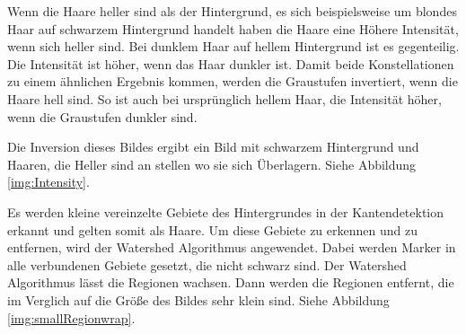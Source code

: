 \documentclass[german,a4paper, 12pt]{llncs}
\begin{document}
Wenn die Haare heller sind als der Hintergrund, es sich beispielsweise um blondes Haar auf schwarzem Hintergrund handelt haben die Haare eine Höhere Intensität, wenn sich heller sind. Bei dunklem Haar auf hellem Hintergrund ist es gegenteilig. Die Intensität ist höher, wenn das Haar dunkler ist.
Damit beide Konstellationen zu einem ähnlichen Ergebnis kommen, werden die Graustufen invertiert, wenn die Haare hell sind. So ist auch bei ursprünglich hellem Haar, die Intensität höher, wenn die Graustufen dunkler sind.



Die Inversion dieses Bildes ergibt ein Bild mit schwarzem Hintergrund und Haaren, die Heller sind an stellen wo sie sich Überlagern. Siehe Abbildung \ref{img:Intensity}.


Es werden kleine vereinzelte Gebiete des Hintergrundes in der Kantendetektion erkannt und gelten somit als Haare.
Um diese Gebiete zu erkennen und zu entfernen, wird der Watershed Algorithmus angewendet.   
Dabei werden Marker in alle verbundenen Gebiete gesetzt, die nicht schwarz sind. Der Watershed Algorithmus lässt die Regionen wachsen. 
Dann werden die Regionen entfernt, die im Verglich auf die Größe des Bildes sehr klein sind. Siehe Abbildung \ref{img:smallRegionwrap}.
\end{document}
